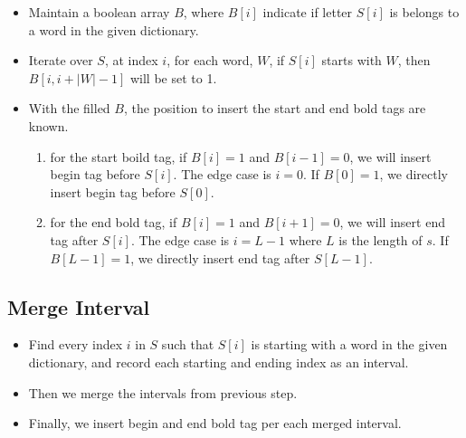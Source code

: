 \begin{itemize}
\item Maintain a boolean array $B$, where $B[i]$ indicate if letter $S[i]$ is belongs to a word in the given dictionary.
\item Iterate over $S$, at index $i$, for each word, $W$, if $S[i]$ starts with $W$, then $B[i, i+\lvert W\rvert-1]$ will be set to 1.
\item With the filled $B$, the position to insert the start and end bold tags are known.
\begin{enumerate}
\item for the start boild tag, if $B[i]=1$ and $B[i-1]=0$, we will insert begin tag before $S[i]$. The edge case is $i=0$. If $B[0]=1$, we directly insert begin tag before $S[0]$.
\item for the end bold tag, if $B[i]=1$ and $B[i+1]=0$, we will insert end tag after $S[i]$. The edge case is $i=L-1$ where $L$ is the length of $s$. If $B[L-1]=1$, we directly insert end tag after $S[L-1]$.
\end{enumerate}
\end{itemize}


\subsection{Merge Interval}
\begin{itemize}
\item Find every index $i$ in $S$ such that $S[i]$ is starting with a word in the given dictionary, and record each starting and ending index as an interval.
\item Then we merge the intervals from previous step. 
\item Finally, we insert begin and end bold tag per each merged interval.
\end{itemize}

